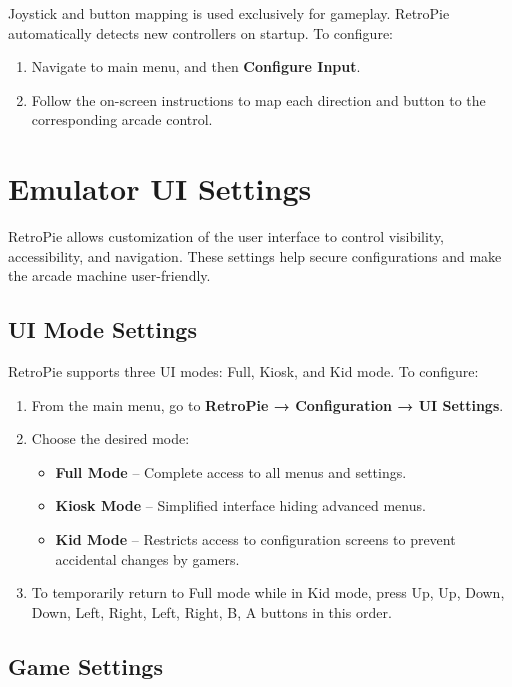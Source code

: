 Joystick and button mapping is used exclusively for gameplay. RetroPie automatically detects new controllers on startup. To configure:

\begin{enumerate}
    \item Navigate to main menu, and then \textbf{Configure Input}.
    \item Follow the on-screen instructions to map each direction and button to the corresponding arcade control.
\end{enumerate}

\section{Emulator UI Settings}
\label{sec:emulator_settings}

RetroPie allows customization of the user interface to control visibility, accessibility, and navigation. These settings help secure configurations and make the arcade machine user-friendly.

\subsection{UI Mode Settings}
\label{subsec:ui_settings}

RetroPie supports three UI modes: Full, Kiosk, and Kid mode. To configure:

\begin{enumerate}
    \item From the main menu, go to \textbf{RetroPie → Configuration → UI Settings}.
    \item Choose the desired mode:
        \begin{itemize}
            \item \textbf{Full Mode} – Complete access to all menus and settings.
            \item \textbf{Kiosk Mode} – Simplified interface hiding advanced menus.
            \item \textbf{Kid Mode} – Restricts access to configuration screens to prevent accidental changes by gamers.
        \end{itemize}
    \item To temporarily return to Full mode while in Kid mode, press Up, Up, Down, Down, Left, Right, Left, Right, B, A buttons in this order.
\end{enumerate}

\subsection{Game Settings}
\label{subsec:game_settings}

